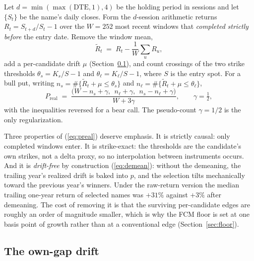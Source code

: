 \documentclass[11pt]{article}
\newcommand{\Preal}{P_{\mathrm{real}}}
\begin{document}
Let $d = \min(\max(\mathrm{DTE}, 1), 4)$ be the holding period in sessions and
let $\{S_t\}$ be the name's daily closes. Form the $d$-session arithmetic
returns $R_t = S_{t+d}/S_t - 1$ over the $W = 252$ most recent windows that
\emph{completed strictly before} the entry date. Remove the window mean,
\begin{equation}
\tilde R_t \;=\; R_t - \frac{1}{W}\sum_{u} R_u ,
\label{eq:demean}
\end{equation}
add a per-candidate drift $\mu$ (Section~\ref{sec:drift}), and count crossings
of the two strike thresholds $\theta_s = K_s/S - 1$ and
$\theta_\ell = K_\ell/S - 1$, where $S$ is the entry spot. For a bull put,
writing $n_s = \#\{\tilde R_t + \mu \leq \theta_s\}$ and
$n_\ell = \#\{\tilde R_t + \mu \leq \theta_\ell\}$,
\begin{equation}
\Preal \;=\; \frac{\bigl(W - n_s + \gamma,\ \ n_\ell + \gamma,\ \
n_s - n_\ell + \gamma\bigr)}{W + 3\gamma},
\qquad \gamma = \tfrac12 ,
\label{eq:preal}
\end{equation}
with the inequalities reversed for a bear call. The pseudo-count
$\gamma = 1/2$ is the only regularization.

Three properties of (\ref{eq:preal}) deserve emphasis. It is strictly causal:
only completed windows enter. It is strike-exact: the thresholds are the
candidate's own strikes, not a delta proxy, so no interpolation between
instruments occurs. And it is \emph{drift-free} by construction
(\ref{eq:demean}): without the demeaning, the trailing year's realized drift
is baked into $p$, and the selection tilts mechanically toward the previous
year's winners. Under the raw-return version the median trailing one-year
return of selected names was $+31\%$ against $+3\%$ after demeaning. The cost
of removing it is that the surviving per-candidate edges are roughly an order
of magnitude smaller, which is why the FCM floor is set at one basis point of
growth rather than at a conventional edge (Section~\ref{sec:floor}).

\subsection{The own-gap drift}
\label{sec:drift}
\end{document}
